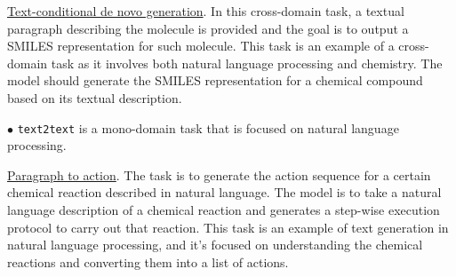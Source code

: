 \documentclass[nohyperref]{article}
\theoremstyle{plain}
\theoremstyle{definition}
\theoremstyle{remark}
\begin{document}
\underline{Text-conditional de novo generation}. In this cross-domain task, a textual paragraph describing the molecule is provided and the goal is to output a SMILES representation for such molecule. This task is an example of a cross-domain task as it involves both natural language processing and chemistry. The model should generate the SMILES representation for a chemical compound based on its textual description.

$\bullet$ \texttt{text2text} is a mono-domain task that is focused on natural language processing.

\underline{Paragraph to action}. The task is to generate the action sequence for a certain chemical reaction described in natural language. The model is to take a natural language description of a chemical reaction and generates a step-wise execution protocol to carry out that reaction. This task is an example of text generation in natural language processing, and it's focused on understanding the chemical reactions and converting them into a list of actions.
\end{document}
